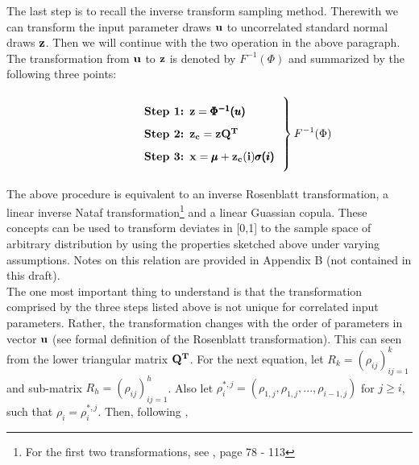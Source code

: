 \documentclass[a4paper,12pt]{article}
\begin{document}
\noindent
The last step is to recall the inverse transform sampling method. Therewith we can transform the input parameter draws $\bold{u}$ to uncorrelated standard normal draws $\bold{z}$. Then we will continue with the two operation in the above paragraph. The transformation from $\bold{u}$ to $\bold{z}$ is denoted by $ F^{-1}(\Phi)$ and summarized by the following three points:


\[
\left.\parbox{0.5\textwidth}{%
\begin{enumerate}[label=\bfseries Step \arabic*:,leftmargin=*,labelindent=5em]
	\item $\bold{z} = \pmb{\Phi^{-1}({u})}$
    \item $\bold{z_c} = \bold{z Q^T}$
    \item $\bold{x} = \pmb{\mu} + \bold{z_c(i)}\pmb{\sigma(i)}$
\end{enumerate}
}\right\}F^{-1}(\Phi)
\]


\noindent
The above procedure is equivalent to an inverse Rosenblatt transformation, a linear inverse Nataf transformation\footnote{For the first two transformations, see \cite{lemaire2013structural}, page 78 - 113} and a linear Guassian copula. These concepts can be used to transform deviates in [0,1] to the sample space of arbitrary distribution by using the properties sketched above under varying assumptions. Notes on this relation are provided in Appendix B (not contained in this draft).\\

\indent
The one most important thing to understand is that the transformation comprised by the three steps listed above is not unique for correlated input parameters. Rather, the transformation changes with the order of parameters in vector $\bold{u}$ (see formal definition of the Rosenblatt transformation). This can seen from the lower triangular matrix $\bold{Q^T}$. For the next equation, let $R_k = (\rho_{ij})_{ij=1}^k$ and sub-matrix $R_h = (\rho_{ij})_{ij=1}^h$. Also let $\rho_i^{*,j} = (\rho_{1,j}, \rho_{1,j}, ..., \rho_{i-1,j})$ for $j \geq i$, such that $\rho_i=\rho_i^{*,j}$. Then, following \cite{madar2015direct}, 
\end{document}

